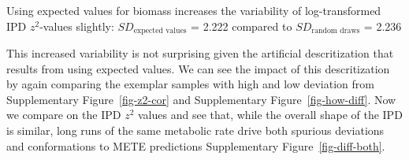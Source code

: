 \documentclass[
  letterpaper,
  DIV=11,
  numbers=noendperiod]{scrartcl}
\newenvironment{Shaded}{\begin{snugshade}}{\end{snugshade}}
\newcommand{\AttributeTok}[1]{\textcolor[rgb]{0.40,0.45,0.13}{#1}}
\newcommand{\FloatTok}[1]{\textcolor[rgb]{0.68,0.00,0.00}{#1}}
\newcommand{\FunctionTok}[1]{\textcolor[rgb]{0.28,0.35,0.67}{#1}}
\newcommand{\NormalTok}[1]{\textcolor[rgb]{0.00,0.23,0.31}{#1}}
\newcommand{\SpecialCharTok}[1]{\textcolor[rgb]{0.37,0.37,0.37}{#1}}
\newcommand{\StringTok}[1]{\textcolor[rgb]{0.13,0.47,0.30}{#1}}
\begin{document}
Using expected values for biomass increases the variability of
log-transformed IPD \(z^2\)-values slightly:
\(SD_\text{expected values}\) = 2.222 compared to
\(SD_\text{random draws}\) = 2.236

This increased variability is not surprising given the artificial
descritization that results from using expected values. We can see the
impact of this descritization by again comparing the exemplar samples
with high and low deviation from Supplementary Figure~\ref{fig-z2-cor}
and Supplementary Figure~\ref{fig-how-diff}. Now we compare on the IPD
\(z^2\) values and see that, while the overall shape of the IPD is
similar, long runs of the same metabolic rate drive both spurious
deviations and conformations to METE predictions Supplementary
Figure~\ref{fig-diff-both}.

\begin{Shaded}
\end{Shaded}
\end{document}
